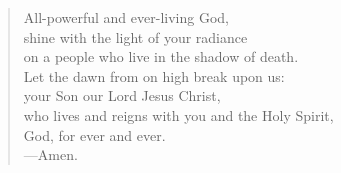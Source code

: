 \prayer

\setlength{\leftmargini}{\prayerleftmargini}

\begin{verse}
All-powerful and ever-living God,\\
shine with the light of your radiance\\
on a people who live in the shadow of death.\\
Let the dawn from on high break upon us:\\
your Son our Lord Jesus Christ,\\
who lives and reigns with you and the Holy Spirit,\\
God, for ever and ever.\\
{\color{red}---\thinspace}Amen.
\end{verse}

\setlength{\leftmargini}{\defleftmargini}